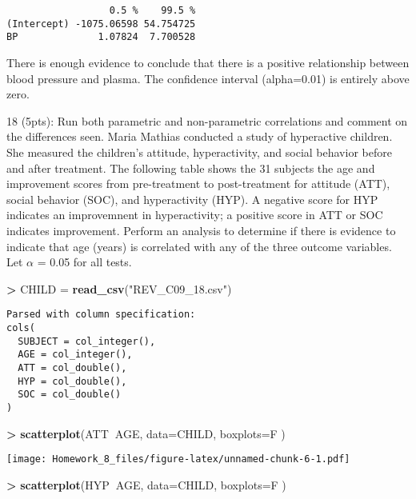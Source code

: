 \documentclass[]{article}
\newenvironment{Shaded}{\begin{snugshade}}{\end{snugshade}}
\newcommand{\KeywordTok}[1]{\textcolor[rgb]{0.13,0.29,0.53}{\textbf{#1}}}
\newcommand{\DataTypeTok}[1]{\textcolor[rgb]{0.13,0.29,0.53}{#1}}
\newcommand{\StringTok}[1]{\textcolor[rgb]{0.31,0.60,0.02}{#1}}
\newcommand{\OperatorTok}[1]{\textcolor[rgb]{0.81,0.36,0.00}{\textbf{#1}}}
\newcommand{\NormalTok}[1]{#1}
\begin{document}
\begin{verbatim}
                  0.5 %    99.5 %
(Intercept) -1075.06598 54.754725
BP              1.07824  7.700528
\end{verbatim}

There is enough evidence to conclude that there is a positive
relationship between blood pressure and plasma. The confidence interval
(alpha=0.01) is entirely above zero.

18 (5pts): Run both parametric and non-parametric correlations and
comment on the differences seen. Maria Mathias conducted a study of
hyperactive children. She measured the children's attitude,
hyperactivity, and social behavior before and after treatment. The
following table shows the 31 subjects the age and improvement scores
from pre-treatment to post-treatment for attitude (ATT), social behavior
(SOC), and hyperactivity (HYP). A negative score for HYP indicates an
improvemnent in hyperactivity; a positive score in ATT or SOC indicates
improvement. Perform an analysis to determine if there is evidence to
indicate that age (years) is correlated with any of the three outcome
variables. Let \(\alpha\) = 0.05 for all tests.

\begin{Shaded}
\begin{Highlighting}[]
\OperatorTok{>}\StringTok{ }\NormalTok{CHILD =}\StringTok{ }\KeywordTok{read_csv}\NormalTok{(}\StringTok{"REV_C09_18.csv"}\NormalTok{)}
\end{Highlighting}
\end{Shaded}

\begin{verbatim}
Parsed with column specification:
cols(
  SUBJECT = col_integer(),
  AGE = col_integer(),
  ATT = col_double(),
  HYP = col_double(),
  SOC = col_double()
)
\end{verbatim}

\begin{Shaded}
\begin{Highlighting}[]
\OperatorTok{>}\StringTok{ }\KeywordTok{scatterplot}\NormalTok{(ATT}\OperatorTok{~}\NormalTok{AGE, }\DataTypeTok{data=}\NormalTok{CHILD, }\DataTypeTok{boxplots=}\NormalTok{F )}
\end{Highlighting}
\end{Shaded}

\texttt{[image: Homework\_8\_files/figure-latex/unnamed-chunk-6-1.pdf]}

\begin{Shaded}
\begin{Highlighting}[]
\OperatorTok{>}\StringTok{ }\KeywordTok{scatterplot}\NormalTok{(HYP}\OperatorTok{~}\NormalTok{AGE, }\DataTypeTok{data=}\NormalTok{CHILD, }\DataTypeTok{boxplots=}\NormalTok{F )}
\end{Highlighting}
\end{Shaded}
\end{document}

